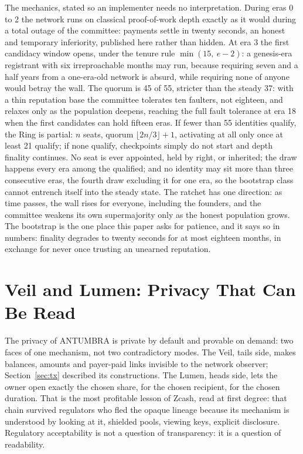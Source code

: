 The mechanics, stated so an implementer needs no interpretation. During
eras 0 to 2 the network runs on classical proof-of-work depth exactly as
it would during a total outage of the committee: payments settle in
twenty seconds, an honest and temporary inferiority, published here
rather than hidden. At era 3 the first candidacy window opens, under the
tenure rule $\min(15,\ e-2)$: a genesis-era registrant with six
irreproachable months may run, because requiring seven and a half years
from a one-era-old network is absurd, while requiring none of anyone
would betray the wall. The quorum is 45 of 55, stricter than the steady
37: with a thin reputation base the committee tolerates ten faulters,
not eighteen, and relaxes only as the population deepens, reaching the
full fault tolerance at era 18 when the first candidates can hold
fifteen eras. If fewer than 55 identities qualify, the Ring is partial:
$n$ seats, quorum $\lfloor 2n/3 \rfloor + 1$, activating at all only
once at least 21 qualify; if none qualify, checkpoints simply do not
start and depth finality continues. No seat is ever appointed, held by
right, or inherited; the draw happens every era among the qualified; and
no identity may sit more than three consecutive eras, the fourth draw
excluding it for one era, so the bootstrap class cannot entrench itself
into the steady state. The ratchet has one direction: as time passes,
the wall rises for everyone, including the founders, and the committee
weakens its own supermajority only as the honest population grows. The
bootstrap is the one place this paper asks for patience, and it says so
in numbers: finality degrades to twenty seconds for at most eighteen
months, in exchange for never once trusting an unearned reputation.

\section{Veil and Lumen: Privacy That Can Be Read}\label{sec:veil}

The privacy of ANTUMBRA is private by default and provable on demand:
two faces of one mechanism, not two contradictory modes. The Veil, tails
side, makes balances, amounts and payer-paid links invisible to the
network observer; Section~\ref{sec:tx} described its constructions. The
Lumen, heads side, lets the owner open exactly the chosen share, for the
chosen recipient, for the chosen duration. That is the most profitable
lesson of Zcash, read at first degree: that chain survived regulators who
fled the opaque lineage because its mechanism is understood by looking at
it, shielded pools, viewing keys, explicit disclosure. Regulatory
acceptability is not a question of transparency: it is a question of
readability.

